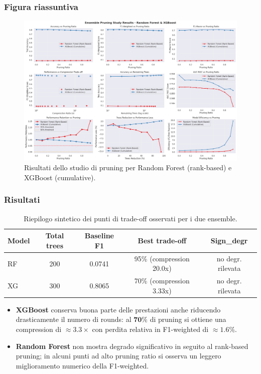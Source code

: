 \documentclass[a4paper,12pt]{report}
\begin{document}
	\subsubsection{Figura riassuntiva}
	\begin{figure}[H]
		\centering
		\includegraphics[width=\textwidth]{img/abl_xgbvsrf_pm.png}
		\caption{Risultati dello studio di pruning per Random Forest (rank-based) e XGBoost (cumulative).}
	\end{figure}
	
	\subsubsection{Risultati}
	\begin{table}[H]
		\centering
		\setlength{\tabcolsep}{4pt}
		\begin{tabular}{lcccc}
			\toprule
			\textbf{Model} & \textbf{Total trees} & \textbf{Baseline F1} & \textbf{Best trade-off} & \textbf{Sign\_degr} \\
			\midrule
			RF & 200 & 0.0741 & 95\% (compression 20.0x) & no degr. rilevata \\
			XG & 300 & 0.8065 & 70\% (compression 3.33x) & no degr. rilevata \\
			\bottomrule
		\end{tabular}
		\caption{Riepilogo sintetico dei punti di trade-off osservati per i due ensemble.}
	\end{table}
	
	\begin{itemize}
		\item \textbf{XGBoost} conserva buona parte delle prestazioni anche riducendo drasticamente il numero di rounds: al \(\mathbf{70\%}\) di pruning si ottiene una compression di \(\approx 3.3\times\) con perdita relativa in F1-weighted di \(\approx 1.6\%\).
		\item \textbf{Random Forest} non mostra degrado significativo in seguito al rank-based pruning; in alcuni punti ad alto pruning ratio si osserva un leggero miglioramento numerico della F1-weighted.
	\end{itemize}
	
\end{document}
